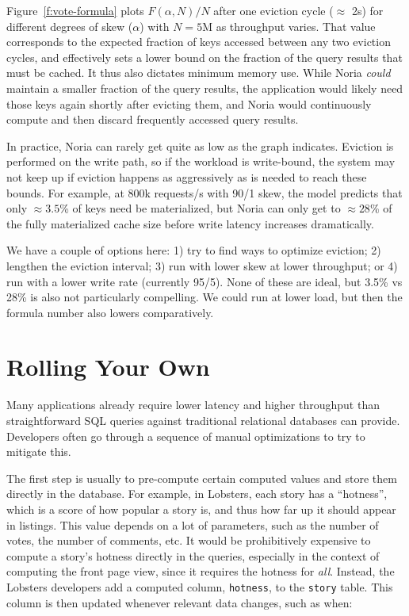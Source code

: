 Figure~\ref{f:vote-formula} plots $F(\alpha, N)/N$ after one eviction cycle
($\approx$ 2s) for different degrees of skew ($\alpha$) with $N=5\text{M}$ as
throughput varies. That value corresponds to the expected fraction of keys
accessed between any two eviction cycles, and effectively sets a lower bound on
the fraction of the query results that must be cached. It thus also dictates
minimum memory use. While Noria \emph{could} maintain a smaller fraction of the
query results, the application would likely need those keys again shortly after
evicting them, and Noria would continuously compute and then discard frequently
accessed query results.

In practice, Noria can rarely get quite as low as the graph indicates. Eviction
is performed on the write path, so if the workload is write-bound, the system
may not keep up if eviction happens as aggressively as is needed to reach these
bounds. For example, at 800k requests/s with 90/1 skew, the model predicts that
only $\approx3.5$\% of keys need be materialized, but Noria can only get to
$\approx28$\% of the fully materialized cache size before write latency
increases dramatically.

\begin{inprogress}
  We have a couple of options here:
    1) try to find ways to optimize eviction;
    2) lengthen the eviction interval;
    3) run with lower skew at lower throughput; or
    4) run with a lower write rate (currently 95/5).
  None of these are ideal, but 3.5\% vs 28\% is also not particularly
  compelling. We could run at lower load, but then the formula number also
  lowers comparatively.
\end{inprogress}

\section{Rolling Your Own}
\label{s:eval:existing}

Many applications already require lower latency and higher throughput than
straightforward SQL queries against traditional relational databases can
provide. Developers often go through a sequence of manual optimizations to try
to mitigate this.

The first step is usually to pre-compute certain computed values and store them
directly in the database. For example, in Lobsters, each story has a
``hotness'', which is a score of how popular a story is, and thus how far up it
should appear in listings. This value depends on a lot of parameters, such as
the number of votes, the number of comments, etc. It would be prohibitively
expensive to compute a story's hotness directly in the queries,
especially in the context of computing the front page view, since it requires
the hotness for \emph{all}. Instead, the Lobsters developers add a computed
column, \texttt{hotness}, to the \texttt{story} table. This column is then
updated whenever relevant data changes, such as when:

